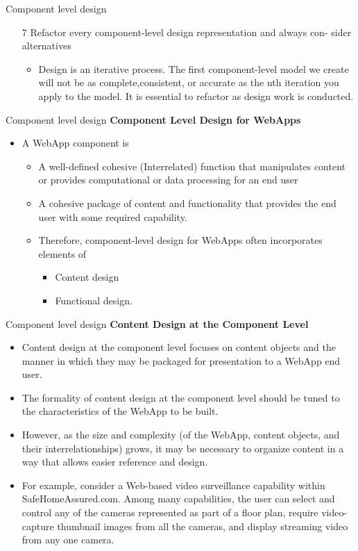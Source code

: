 \documentclass{beamer}
\begin{document}
\begin{frame}{Component level design}
	\begin{itemize}
		\item[7]Refactor every component-level design representation and always con- sider
		alternatives
		\begin{itemize}
			\item Design is an iterative process. The first component-level model we
			create will not be as complete,consistent, or accurate as the nth iteration you apply 
			to the model. It is essential to refactor as design work is conducted.
		\end{itemize}
	\end{itemize}	
\end{frame}


\begin{frame}{Component level design}
	\textbf{Component Level Design for WebApps}
	\begin{itemize}
		\item A WebApp component is 
		\begin{itemize}
			\item A well-defined cohesive (Interrelated) function that manipulates content or provides computational or data processing for an end user
			\item A cohesive package of content and functionality that provides the end user with some required capability. 
			\item Therefore, component-level design for WebApps often incorporates elements of 
			\begin{itemize}
				\item Content design 
				\item Functional design.
			\end{itemize}
		\end{itemize}
	\end{itemize}	
\end{frame}
\begin{frame}{Component level design}
	\textbf{Content Design at the Component Level }
	\begin{itemize}
		\item Content design at the component level focuses on content objects and the manner in which they may be packaged for presentation to a WebApp end user. 
		\item The formality of content design at the component level should be tuned to the characteristics of the WebApp to be built. 
		\item However, as the size and complexity (of the WebApp, content objects, and their interrelationships) grows, it may be necessary to organize content in a way that allows easier reference and design. 
		\item For example, consider a Web-based video surveillance capability within SafeHomeAssured.com. Among many capabilities, the user can select and control any of the cameras represented as part of a floor plan, require video-capture thumbnail images from all the cameras, and display streaming video from any one camera.
	\end{itemize}	
\end{frame}
\end{document}
